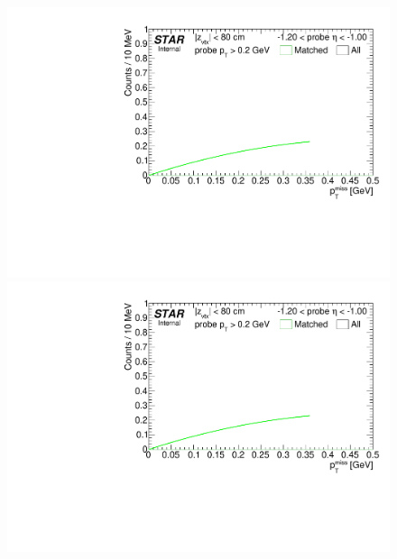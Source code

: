 \begin{figure}[ht]
{  \includegraphics[width=\linewidth,page=8]{graphics/systematicsEfficiency/TOF_tagAndProbe/Fitting_effVsEta_mc.pdf}\\
  \includegraphics[width=\linewidth,page=9]{graphics/systematicsEfficiency/TOF_tagAndProbe/Fitting_effVsEta_mc.pdf}\\
}%
\end{figure}
